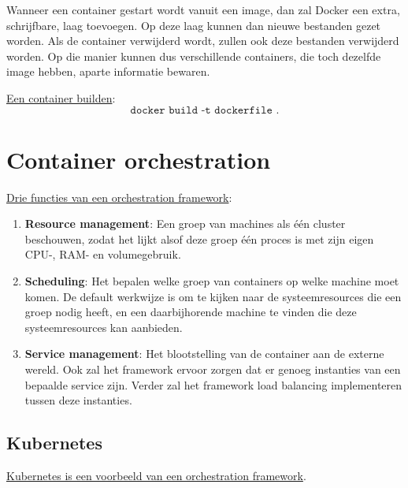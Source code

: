 	Wanneer een container gestart wordt vanuit een image, dan zal Docker een extra, schrijfbare, laag toevoegen. Op deze laag kunnen dan nieuwe bestanden gezet worden. Als de container verwijderd wordt, zullen ook deze bestanden verwijderd worden. Op die manier kunnen dus verschillende containers, die toch dezelfde image hebben, aparte informatie bewaren. 

	\underline{Een container builden}:
$$\texttt{docker build -t dockerfile .}$$
	\chapter{Container orchestration}
	\underline{Drie functies van een orchestration framework}:
	\begin{enumerate}
		\item[\info]\textbf{Resource management}: Een groep van machines als één cluster beschouwen, zodat het lijkt alsof deze groep één proces is met zijn eigen CPU-, RAM- en volumegebruik.
		\item[\info]\textbf{Scheduling}: Het bepalen welke groep van containers op welke machine moet komen. De default werkwijze is om te kijken naar de systeemresources die een groep nodig heeft, en een daarbijhorende machine te vinden die deze systeemresources kan aanbieden.
		\item[\info]\textbf{Service management}: Het blootstelling van de container aan de externe wereld. Ook zal het framework ervoor zorgen dat er genoeg instanties van een bepaalde service zijn. Verder zal het framework load balancing implementeren tussen deze instanties.
	\end{enumerate}

	\section{Kubernetes}
	\underline{Kubernetes is een voorbeeld van een orchestration framework}.


